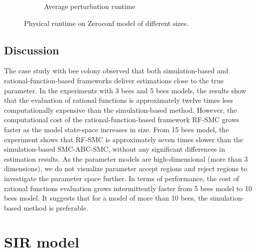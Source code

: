 \begin{figure}[H]
\begin{subfigure}{0.4\textwidth}
        \caption{Average perturbation runtime}
    \end{subfigure}
    \caption{Physical runtime on Zeroconf model of different sizes.}
\end{figure}
\subsection{Discussion}
The case study with bee colony observed that both simulation-based and rational-function-based
frameworks deliver estimations close to the true parameter. In the experiments with 3 bees and 5
bees models, the results show that the evaluation of rational functions is approximately twelve
times less computationally expensive than the simulation-based method. However, the computational
cost of the rational-function-based framework RF-SMC grows faster as the model state-space increases
in size. From 15 bees model, the experiment shows that RF-SMC is approximately seven times slower
than the simulation-based SMC-ABC-SMC, without any significant differences in estimation results. As
the parameter models are high-dimensional (more than 3 dimensions), we do not visualize parameter
accept regions and reject regions to investigate the parameter space further. In terms of
performance,  the cost of rational functions evaluation grows intermittently faster from 5 bees
model to 10 bees model. It suggests that for a model of more than 10 bees, the simulation-based
method is preferable.

\section{SIR model}
